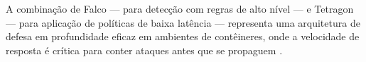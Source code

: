 A combinação de Falco --- para detecção com regras de alto nível --- e Tetragon ---
para aplicação de políticas de baixa latência --- representa uma arquitetura de
defesa em profundidade eficaz em ambientes de contêineres, onde a velocidade de
resposta é crítica para conter ataques antes que se propaguem
\cite{beyer2016,cassagnes2020}.
